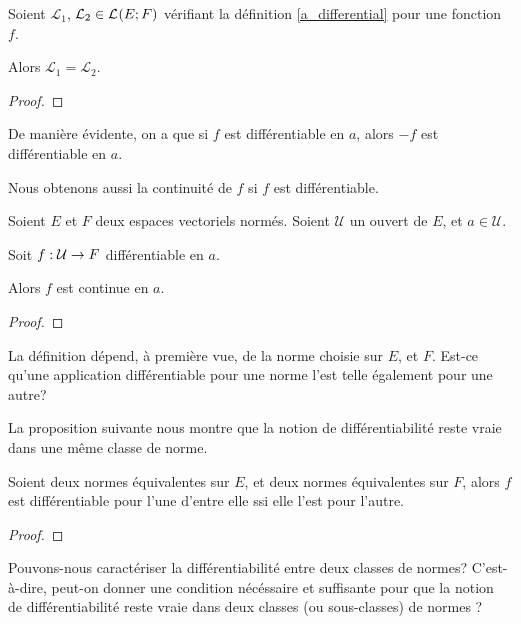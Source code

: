 \begin{proposition}
	Soient $\mathcal{L}_{1}$, $\mathcal{L}_{2} \in \mathcal{L}_{}(E; F)$
	vérifiant la définition \ref{a_differential} pour une fonction $f$.

	Alors $\mathcal{L}_{1} = \mathcal{L}_{2}$.
\end{proposition}

\ifdefined\outputproof
\begin{proof}

\end{proof}
\fi

De manière évidente, on a que si $f$ est différentiable en $a$, alors $-f$ est
différentiable en $a$.

Nous obtenons aussi la continuité de $f$ si $f$ est différentiable.

\begin{proposition}
	Soient $E$ et $F$ deux espaces vectoriels normés.
	Soient $\mathcal{U}$ un ouvert de $E$, et $a \in \mathcal{U}$.

	Soit $f : \mathcal{U} \rightarrow F$ différentiable en $a$.

	Alors $f$ est continue en $a$.
\end{proposition}

\ifdefined\outputproof
\begin{proof}

\end{proof}
\fi

La définition dépend, à première vue, de la norme choisie sur $E$, et $F$. Est-ce
qu'une application différentiable pour une norme l'est telle également pour une
autre?

La proposition suivante nous montre que la notion de différentiabilité reste
vraie dans une même classe de norme.

\begin{proposition}
	Soient deux normes équivalentes sur $E$, et deux normes équivalentes sur
	$F$, alors $f$ est différentiable pour l'une d'entre elle ssi elle l'est
	pour l'autre.
\end{proposition}

\ifdefined\outputproof
\begin{proof}

\end{proof}
\fi

\begin{question}
	Pouvons-nous caractériser la différentiabilité entre deux classes de
	normes? C'est-à-dire, peut-on donner une condition nécéssaire et suffisante
	pour que la notion de différentiabilité reste vraie dans deux classes (ou
	sous-classes) de normes ?
\end{question}

